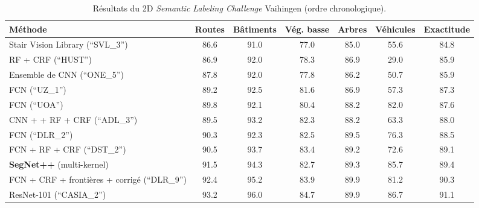 \begin{table}[t]
  \centering
  \caption{Résultats du  2D \emph{Semantic Labeling Challenge} Vaihingen (ordre chronologique).}
  \begin{tabularx}{\textwidth}{ Y c c c c c c }
  \toprule
  Méthode & Routes & Bâtiments & Vég. basse & Arbres & Véhicules & Exactitude\\
  \midrule
  Stair Vision Library {\scriptsize (``SVL\_3'')}\cite{gerke_use_2015} & \num{86,6} &	\num{91,0} &	\num{77,0} &	\num{85,0}	& \num{55,6} &	\num{84,8} \\
  RF + CRF {\scriptsize (``HUST'')}\cite{quang_efficient_2015} & \num{86,9} & \num{92,0} &	\num{78,3} &	\num{86,9} &	\num{29,0} &	\num{85,9} \\
  Ensemble de CNN {\scriptsize (``ONE\_5'')}\cite{boulch_dag_2015} & \num{87,8} &	\num{92,0} &	\num{77,8} &	\num{86,2} &	\num{50,7} &	\num{85,9} \\
  FCN {\scriptsize (``UZ\_1'')}\cite{volpi_dense_2017} & \num{89,2} &	\num{92,5} &	\num{81,6} &	\num{86,9} &	\num{57,3} &	\num{87,3} \\
  FCN {\scriptsize (``UOA'')}\cite{lin_efficient_2015} & \num{89,8} &	\num{92,1} &	\num{80,4} &	\num{88,2} &	\num{82,0} &	\num{87,6} \\
  CNN +  + RF + CRF {\scriptsize (``ADL\_3'')}\cite{paisitkriangkrai_effective_2015} & \num{89,5} &	\num{93,2} &	\num{82,3} &	\num{88,2} &	\num{63,3} &	\num{88,0} \\
  FCN {\scriptsize (``DLR\_2'')}\cite{marmanis_semantic_2016} & \num{90,3} &	\num{92,3} &	\num{82,5} &	\num{89,5} &	\num{76,3} &	\num{88,5} \\
  FCN + RF + CRF {\scriptsize (``DST\_2'')}\cite{sherrah_fully_2016} & \num{90,5} &	\num{93,7} &	\num{83,4} &	\num{89,2} &	\num{72,6} &	\num{89,1} \\
  \midrule
  \textbf{SegNet++} (multi-kernel)\cite{audebert_semantic_2016} & \num{91,5} &	\num{94,3} &	\num{82,7} &	\num{89,3} &	\num{85,7} &	\num{89,4} \\
	\midrule
	FCN + CRF + frontières +  corrigé {\scriptsize (``DLR\_9'')}\cite{marmanis_classification_2017} & \num{92.4} & \num{95.2} & \num{83.9} & \num{89.9} & \num{81.2} & \num{90.3}\\
	ResNet-101 {\scriptsize (``CASIA\_2'')}~\cite{liu_semantic_2017} & \num{93.2} &	\num{96.0} & \num{84.7}	& \num{89.9} & \num{86.7} & \num{91.1}\\
  \bottomrule
  \end{tabularx}
  \label{tab:final_vaihingen}
\end{table}

